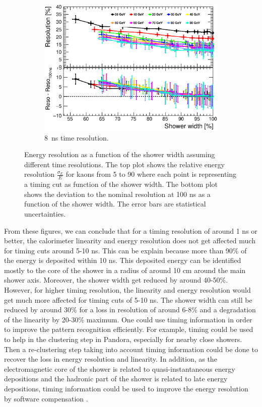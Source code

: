 \begin{figure}[htbp!]
\begin{subfigure}[t]{0.6\textwidth}
    \centering
    \includegraphics[width=1\linewidth]{../Thesis_Plots/ILD/Smearing_8ns/Plots/ShowerWidth_Resolution_Smearing3.eps}
    \caption{\SI{8}{\nano\second} time resolution.} \label{fig:WidthReso8ns}
  \end{subfigure}
  \caption{Energy resolution as a function of the shower width assuming different time resolutions. The top plot shows the relative energy resolution $\frac{\sigma_{E}}{E}$ for kaons from 5 to 90 \GeV where each point is representing a timing cut as function of the shower width. The bottom plot shows the deviation to the nominal resolution at 100 ns as a function of the shower width. The error bars are statistical uncertainties.}
\end{figure}

From these figures, we can conclude that for a timing resolution of around 1 ns or better, the calorimeter linearity and energy resolution does not get affected much for timing cuts around 5-10 ns. This can be explain because more than 90\% of the energy is deposited within 10 ns. This deposited energy can be identified mostly to the core of the shower in a radius of around 10 cm around the main shower axis. Moreover, the shower width get reduced by around 40-50\%. However, for higher timing resolution, the linearity and energy resolution would get much more affected for timing cuts of 5-10 ns. The shower width can still be reduced by around 30\% for a loss in resolution of around 6-8\% and a degradation of the linearity by 20-30\% maximum. One could use timing information in order to improve the pattern recognition efficiently. For example, timing could be used to help in the clustering step in Pandora, especially for nearby close showers. Then a re-clustering step taking into account timing information could be done to recover the loss in energy resolution and linearity. In addition, as the electromagnetic core of the shower is related to quasi-instantaneous energy depositions and the hadronic part of the shower is related to late energy depositions, timing information could be used to improve the energy resolution by software compensation \cite{Benaglia2016}.

